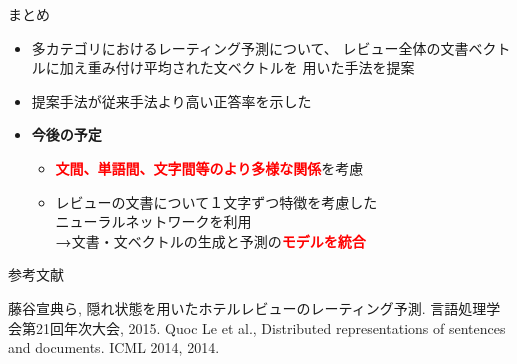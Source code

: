 \documentclass[unicode,10pt]{beamer}
\newlength{\mycolumnwidth}
\newcommand{\arrow}{\textcolor{ttiblue}{\textbf{→}}\hspace{1ex}}
\newcommand{\itemtitle}[1]{\textbf{#1}\\}
\newcommand{\fire}[1]{\textcolor{red}{\textbf{#1}}}
\begin{document}
\begin{frame}[t]
\begin{columns}[onlytextwidth,t]
\begin{column}{\mycolumnwidth}
  \begin{block}{まとめ}
    \begin{itemize}
      \item 多カテゴリにおけるレーティング予測について、
            レビュー全体の文書ベクトルに加え重み付け平均された文ベクトルを
            用いた手法を提案
      \item 提案手法が従来手法\cite{fujitani15}より高い正答率を示した
      \item \itemtitle{今後の予定}
        \begin{itemize}
          \item \fire{文間、単語間、文字間等のより多様な関係}を考慮
          \item レビューの文書について１文字ずつ特徴を考慮した\\
                ニューラルネットワークを利用 \\
                \arrow 文書・文ベクトルの生成と予測の\fire{モデルを統合}
        \end{itemize}
    \end{itemize}
  \end{block}

  参考文献
  
  \begin{thebibliography}{9}
      藤谷宣典ら,
      隠れ状態を用いたホテルレビューのレーティング予測.
      言語処理学会第21回年次大会, 2015.
      Quoc Le et al.,
      Distributed representations of sentences and documents.
      ICML 2014, 2014.
  \end{thebibliography}
\end{column}

\end{columns}
\end{frame}
\end{document}
